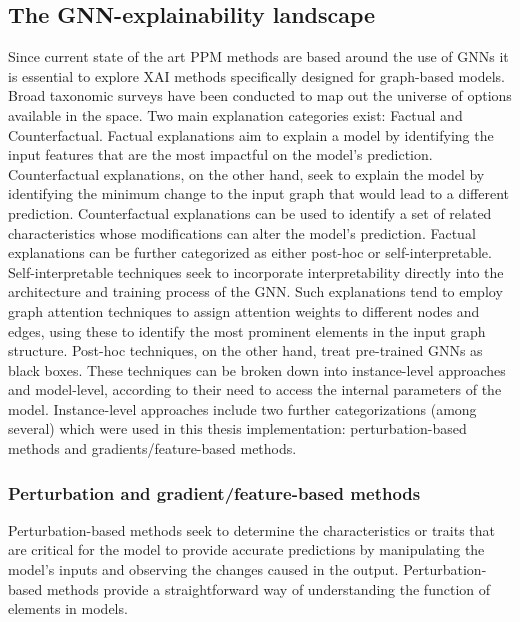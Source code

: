         \subsection{The GNN-explainability landscape}
        Since current state of the art PPM methods are based around the use of GNNs it is essential to explore XAI methods specifically designed for graph-based models. Broad taxonomic surveys \cite{nandan2025} have been conducted to map out the universe of options available in the space. 
        Two main explanation categories exist: Factual and Counterfactual. Factual explanations aim to explain a model by identifying the input features that are the most impactful on the model's prediction. Counterfactual explanations, on the other hand, seek to explain the model by identifying the minimum change to the input graph that would lead to a different prediction. Counterfactual explanations can be used to identify a set of related characteristics whose modifications can alter the model's prediction.
        Factual explanations can be further categorized as either post-hoc or self-interpretable. Self-interpretable techniques seek to incorporate interpretability directly into the architecture and training process of the GNN. Such explanations tend to employ graph attention techniques to assign attention weights to different nodes and edges, using these to identify the most prominent elements in the input graph structure.
        Post-hoc techniques, on the other hand, treat pre-trained GNNs as black boxes. These techniques can be broken down into instance-level approaches and model-level, according to their need to access the internal parameters of the model.
        Instance-level approaches include two further categorizations (among several) which were used in this thesis implementation: perturbation-based methods and gradients/feature-based methods.

    \subsubsection{Perturbation and gradient/feature-based methods}
    \label{sec:rw_pert_exp}
        Perturbation-based methods seek to determine the characteristics or traits that are critical for the model to provide accurate predictions by manipulating the model's inputs and observing the changes caused in the output. Perturbation-based methods provide a straightforward way of understanding the function of elements in models.

